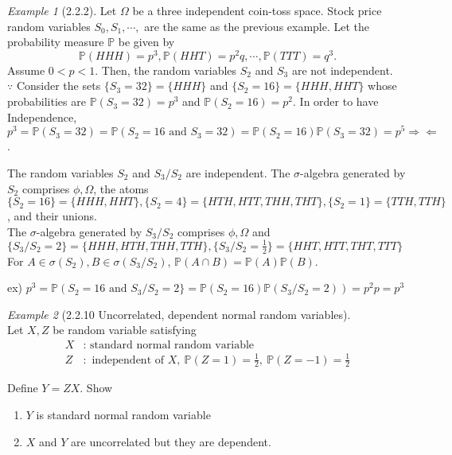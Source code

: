 \documentclass[12pt]{report}
\renewcommand{\1}{\mathbb{1}}
\theoremstyle{break}
\theoremstyle{newdef}
\theoremstyle{remark}
\newtheorem*{exmp}{Example} %
\begin{document}
\begin{appendices}
\begin{exmp}[2.2.2]
Let $\Omega$ be a three independent coin-toss space.
Stock price random variables $S_0, S_1, \cdots,$ are the same as the previous example.
Let the probability measure $\mathbb{P}$ be given by
$$\mathbb{P}(HHH) = p^3, \mathbb{P}(HHT) = p^2q, \cdots, \mathbb{P}(TTT) = q^3.$$
Assume $0 < p < 1$.
Then, the random variables $S_2$ and $S_3$ are not independent.\\
$\because$ Consider the sets $\{S_3 = 32\} = \{ HHH \}$ and $\{S_2 = 16\} = \{HHH, HHT \}$ whose probabilities are
$\mathbb{P}(S_3 = 32) = p^3$ and $\mathbb{P}(S_2 = 16) = p^2$.
In order to have Independence, $p^3 = \mathbb{P}(S_3 = 32) = \mathbb{P}(S_2 = 16 \text{ and } S_3 = 32) = \mathbb{P}(S_2 = 16)\mathbb{P}(S_3 = 32) = p^5\Rightarrow\!\Leftarrow$.

The random variables $S_2$ and $S_3/S_2$ are independent.
The $\sigma$-algebra generated by $S_2$ comprises $\phi, \Omega$, the atoms\\
$\{S_2 = 16\} = \{ HHH, HHT\}
, \{S_2=  4\} = \{ HTH, HTT, THH, THT\}
, \{S_2 = 1\} = \{TTH, TTH\}$, and their unions.\\

The $\sigma$-algebra generated by $S_3/S_2$ comprises $\phi, \Omega$ and\\
$\{S_3/S_2 = 2\} = \{HHH, HTH, THH, TTH\}
, \{S_3/S_2 = \frac{1}{2} \} = \{ HHT, HTT, THT, TTT\}$\\

For $A \in \sigma(S_2), B \in \sigma(S_3/S_2)$,
$\mathbb{P}(A \cap B) = \mathbb{P}(A)\mathbb{P}(B)$.

ex) $p^3 = \mathbb{P}(S_2 = 16 \text{ and } S_3/S_2 = 2\} = \mathbb{P}(S_2 = 16)\mathbb{P}(S_3/S_2 = 2)) = p^2 p = p^3$

\end{exmp}

\vspace{5mm}

\begin{exmp}[2.2.10 Uncorrelated, dependent normal random variables]
\leavevmode\\
Let $X, Z$ be random variable satisfying
$$
\begin{aligned}
X&: \text{ standard normal random variable}\\
Z&: \text{ independent of } X,\ \mathbb{P}(Z = 1) = \frac{1}{2},\ \mathbb{P}(Z = -1) = \frac{1}{2}
\end{aligned}
$$

Define $Y = ZX$.
Show
\begin{enumerate}
\item $Y$ is standard normal random variable
\item $X$ and $Y$ are uncorrelated but they are dependent.
\end{enumerate}



\end{exmp}
\end{appendices}
\end{document}
